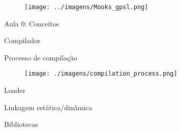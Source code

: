\documentclass{beamer}
\begin{document}

\begin{frame}
    \begin{figure}[h]
        \centering
        \texttt{[image: ../imagens/Mooks\_gpsl.png]}
    \end{figure}
    \begin{center}
        \Huge Aula 0: Conceitos
    \end{center}
\end{frame}

\begin{frame}{Compilador}
    
\end{frame}

\begin{frame}{Processo de compilação}
    \begin{figure}[h]
        \centering
        \texttt{[image: ./imagens/compilation\_process.png]}
    \end{figure}
\end{frame}

\begin{frame}{Loader}
    
\end{frame}

\begin{frame}{Linkagem estática/dinâmica}
    
\end{frame}

\begin{frame}{Bibliotecas}
    
\end{frame}
\end{document}

